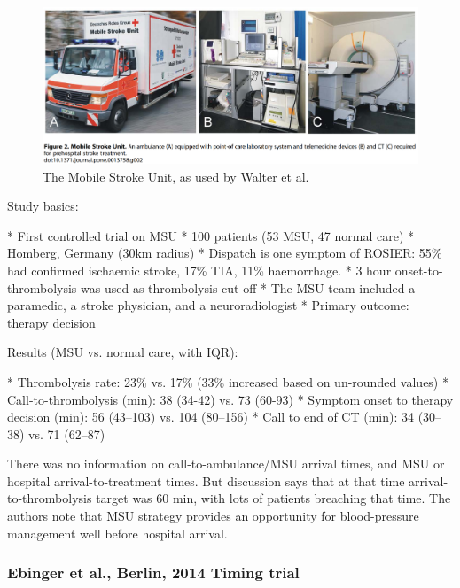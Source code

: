 \begin{figure}[ht]
    \centering
    \includegraphics[width=0.95\linewidth]{images_background/walter_msu}
    \caption{The Mobile Stroke Unit, as used by Walter et al.}
    \label{fig:walter_msu}
\end{figure}

Study basics:

\begin{markdown}
* First controlled trial on MSU
* 100 patients (53 MSU, 47 normal care)
* Homberg, Germany (30km radius)
* Dispatch is one symptom of ROSIER: 55\% had confirmed ischaemic stroke, 17\% TIA, 11\% haemorrhage.
* 3 hour onset-to-thrombolysis was used as thrombolysis cut-off
* The MSU team included a paramedic, a stroke physician, and a neuroradiologist
* Primary outcome: therapy decision
\end{markdown}

Results (MSU vs. normal care, with IQR):

\begin{markdown}
* Thrombolysis rate: 23\% vs. 17\% (33\% increased based on un-rounded values)
* Call-to-thrombolysis (min): 38 (34-42) vs. 73 (60-93)
* Symptom onset to therapy decision (min): 56 (43–103) vs. 104 (80–156)
* Call to end of CT (min): 34 (30–38) vs. 71 (62–87)
\end{markdown}

There was no information on call-to-ambulance/MSU arrival times, and MSU or hospital arrival-to-treatment times. But discussion says that at that time arrival-to-thrombolysis target was 60 min, with lots of patients breaching that time. The authors note that MSU strategy provides an opportunity for  blood-pressure management well before hospital arrival.

\subsubsection{Ebinger et al., Berlin, 2014 Timing trial \cite{ebinger_effect_2014}}


